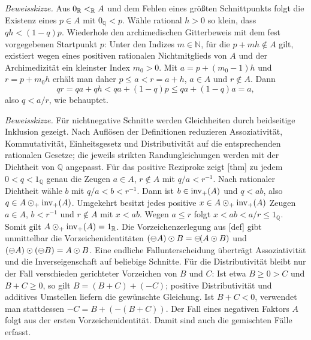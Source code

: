 \documentclass[main.tex]{subfiles}
\begin{document}
\emph{Beweisskizze.}
Aus \(0_{\mathbb R}\mathrel{<_{\mathbb R}} A\) und dem Fehlen eines größten Schnittpunkts folgt
die Existenz eines \(p\in A\) mit \(0_{\mathbb Q}<p\). Wähle rational
\(h>0\) so klein, dass \(qh<(1-q)p\). Wiederhole den archimedischen
Gitterbeweis mit dem fest vorgegebenen Startpunkt \(p\): Unter den Indizes
\(m\in\mathbb N\), für die \(p+mh\notin A\) gilt, existiert wegen eines
positiven rationalen Nichtmitglieds von \(A\) und der Archimedizität ein
kleinster Index \(m_0>0\). Mit
\(a=p+(m_0-1)h\) und \(r=p+m_0h\) erhält man daher
\(p\leq a<r=a+h\), \(a\in A\) und \(r\notin A\). Dann
\[
  qr=qa+qh<qa+(1-q)p\leq qa+(1-q)a=a,
\]
also \(q<a/r\), wie behauptet.


\emph{Beweisskizze.}
Für nichtnegative Schnitte werden Gleichheiten durch beidseitige Inklusion
gezeigt. Nach Auflösen der Definitionen reduzieren Assoziativität,
Kommutativität, Einheitsgesetz und Distributivität auf die entsprechenden
rationalen Gesetze; die jeweils strikten Randungleichungen werden mit der
Dichtheit von \(\mathbb Q\) angepasst. Für das positive Reziproke zeigt
[thm] zu jedem
\(0<q<1_{\mathbb Q}\) genau die Zeugen \(a\in A\), \(r\notin A\) mit
\(q/a<r^{-1}\). Nach rationaler Dichtheit wähle
\(b\) mit \(q/a<b<r^{-1}\). Dann ist
\(b\in\operatorname{inv}_{+}\!\left(A\right)\) und \(q<ab\), also
\(q\in A\mathbin{\odot_{+}}\operatorname{inv}_{+}\!\left(A\right)\). Umgekehrt besitzt jedes positive
\(x\in A\mathbin{\odot_{+}}\operatorname{inv}_{+}\!\left(A\right)\) Zeugen \(a\in A\),
\(b<r^{-1}\) und \(r\notin A\) mit \(x<ab\). Wegen \(a\leq r\) folgt
\(x<ab<a/r\leq1_{\mathbb Q}\). Somit gilt
\(A\mathbin{\odot_{+}}\operatorname{inv}_{+}\!\left(A\right)=1_{\mathbb R}\).
Die Vorzeichenzerlegung aus
[def] gibt unmittelbar die
Vorzeichenidentitäten
\((\mathop{\ominus}\!A)\mathbin{\odot} B=\mathop{\ominus}\!(A\mathbin{\odot} B)\) und
\((\mathop{\ominus}\!A)\mathbin{\odot}(\mathop{\ominus}\!B)=A\mathbin{\odot} B\). Eine endliche
Fallunterscheidung überträgt Assoziativität und die Inverseigenschaft auf
beliebige Schnitte. Für die Distributivität bleibt nur der Fall verschieden
gerichteter Vorzeichen von \(B\) und \(C\): Ist etwa
\(B\geq0>C\) und \(B+C\geq0\), so gilt
\(B=(B+C)+(-C)\); positive Distributivität und additives Umstellen liefern
die gewünschte Gleichung. Ist \(B+C<0\), verwendet man stattdessen
\(-C=B+(-(B+C))\). Der Fall eines negativen Faktors \(A\) folgt aus der
ersten Vorzeichenidentität. Damit sind auch die gemischten Fälle erfasst.
\end{document}
